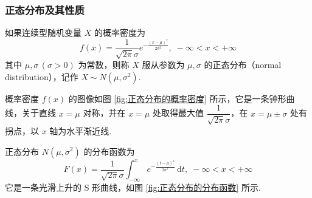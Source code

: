 \subsubsection{正态分布及其性质}

\begin{definition}
    \indent 如果连续型随机变量 $X$ 的概率密度为
    $$
    f(x) = \dfrac{1}{\sqrt{2\pi} \sigma} e^{-\frac{(x-\mu)^2}{2\sigma^2}}, \; -\infty < x < +\infty
    $$
    其中 $\mu,\sigma \, (\sigma>0)$ 为常数，则称 $X$ 服从参数为 $\mu,\sigma$ 的{\heiti 正态分布}（normal distribution），记作 $X \sim N(\mu,\sigma^2)$.
\end{definition}

概率密度 $f(x)$ 的图像如图 \ref{fig:正态分布的概率密度} 所示，它是一条钟形曲线，关于直线 $x=\mu$ 对称，并在 $x=\mu$ 处取得最大值 $\dfrac{1}{\sqrt{2\pi}\sigma}$，在 $x=\mu\pm\sigma$ 处有拐点，以 $x$ 轴为水平渐近线.

正态分布 $N(\mu,\sigma^2)$ 的分布函数为
$$
F(x) = \dfrac{1}{\sqrt{2\pi} \sigma} \int_{-\infty}^x e^{-\frac{(t-\mu)^2}{2\sigma^2}} \, \text{d}t, \; -\infty < x < +\infty
$$
它是一条光滑上升的 S 形曲线，如图 \ref{fig:正态分布的分布函数} 所示.

